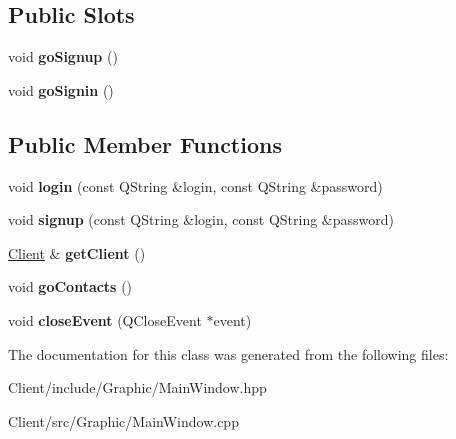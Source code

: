 \subsection*{Public Slots}
\begin{DoxyCompactItemize}
\item 
\mbox{\label{classbbl_1_1cli_1_1graphics_1_1_main_window_ae857b62241e491a5555ed489014dcf1f}} 
void {\bfseries go\+Signup} ()
\item 
\mbox{\label{classbbl_1_1cli_1_1graphics_1_1_main_window_af020576ab1d1e0e7050f2bf73e018188}} 
void {\bfseries go\+Signin} ()
\end{DoxyCompactItemize}
\subsection*{Public Member Functions}
\begin{DoxyCompactItemize}
\item 
\mbox{\label{classbbl_1_1cli_1_1graphics_1_1_main_window_adc89b3344ef0a716d5301e94ae61d784}} 
void {\bfseries login} (const Q\+String \&login, const Q\+String \&password)
\item 
\mbox{\label{classbbl_1_1cli_1_1graphics_1_1_main_window_adc7a86fda96a758fd16a6cc86ab8ce2c}} 
void {\bfseries signup} (const Q\+String \&login, const Q\+String \&password)
\item 
\mbox{\label{classbbl_1_1cli_1_1graphics_1_1_main_window_ac247f6f688a0793541a517aa689b43cc}} 
\hyperlink{classbbl_1_1cli_1_1_client}{Client} \& {\bfseries get\+Client} ()
\item 
\mbox{\label{classbbl_1_1cli_1_1graphics_1_1_main_window_a39f535d7e99763b58ee9415d95f412fa}} 
void {\bfseries go\+Contacts} ()
\item 
\mbox{\label{classbbl_1_1cli_1_1graphics_1_1_main_window_a4e20a4a065fbb0e4d3532a45a0a91425}} 
void {\bfseries close\+Event} (Q\+Close\+Event $\ast$event)
\end{DoxyCompactItemize}


The documentation for this class was generated from the following files\+:\begin{DoxyCompactItemize}
\item 
Client/include/\+Graphic/Main\+Window.\+hpp\item 
Client/src/\+Graphic/Main\+Window.\+cpp\end{DoxyCompactItemize}
